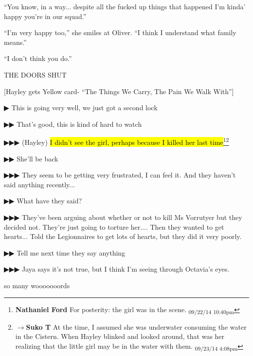 ``You know, in a way... despite all the fucked up things that happened I'm kinda' happy you're in our squad.''

``I'm very happy too,'' she smiles at Oliver.  ``I think I understand what family means.''

``I don't think you do.''

THE DOORS SHUT



{[}Hayley gets Yellow card- ``The Things We Carry, The Pain We Walk With''{]}



 {\color[RGB]{68,68,68}▶}  This is going very well, we just got a second lock

 {\color[RGB]{68,68,68}▶▶}  That's good, this is kind of hard to watch

 {\color[RGB]{68,68,68}▶▶▶ (Hayley) } \hl{I didn't see the girl, perhaps because I killed her last time}\footnote{\textbf{Nathaniel Ford }For posterity: the girl was in the scene. \textsubscript{09/22/14 10:40pm}}\footnote{$\rightarrow$\textbf{Suko T }At the time, I assumed she was underwater consuming the water in the Cistern.  When Hayley blinked and looked around, that was her realizing that the little girl may be in the water with them. \textsubscript{09/23/14 4:08pm}}

 {\color[RGB]{68,68,68}▶▶}  She'll be back

 {\color[RGB]{68,68,68}▶▶▶}  They seem to be getting very frustrated, I can feel it. And they haven't said anything recently...

 {\color[RGB]{68,68,68}▶▶} What have they said?

 {\color[RGB]{68,68,68}▶▶▶} They've been arguing about whether or not to kill Ms Vorrutyer but they decided not. They're just going to torture her.... Then they wanted to get hearts... Told the Legionnaires to get lots of hearts, but they did it very poorly.

 {\color[RGB]{68,68,68}▶▶} Tell me next time they say anything

 {\color[RGB]{68,68,68}▶▶▶} Jaya says it's not true, but I think I'm seeing through Octavia's eyes. 

so many wooooooords





